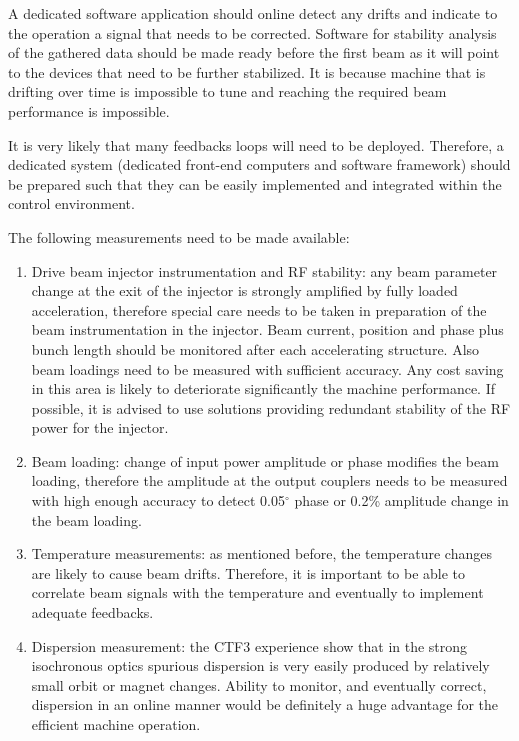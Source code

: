 A dedicated software application should online detect any drifts and 
indicate to the operation a signal that needs to be corrected.
Software for stability analysis of the gathered data should be made ready before the first beam
as it will point to the devices that need to be further stabilized. 
It is because machine that is drifting over time is impossible to tune 
and reaching the required beam performance is impossible.

It is very likely that many feedbacks loops will need to be deployed. 
Therefore, a dedicated system (dedicated front-end computers and software framework) 
should be prepared such that they can be easily implemented
and integrated within the control environment.

The following measurements need to be made available:
\begin{enumerate}

\item Drive beam injector instrumentation and RF stability: any beam parameter change at the exit of the injector
      is strongly amplified by fully loaded acceleration, therefore special care needs to be taken in preparation of
      the beam instrumentation in the injector. Beam current, position and phase plus bunch length should 
      be monitored after each accelerating structure. Also beam loadings need to be measured with sufficient 
      accuracy. Any cost saving in this area is likely to deteriorate significantly the machine performance. 
      If possible, it is advised to use solutions providing redundant stability of the RF power for the injector.

\item Beam loading: change of input power amplitude or phase modifies the beam loading,
      therefore the amplitude at the output couplers needs to be measured with high enough accuracy
      to detect 0.05$^\circ$ phase or 0.2\% amplitude change in the beam loading.

\item Temperature measurements: as mentioned before, the temperature changes are likely to cause beam drifts.
      Therefore, it is important to be able to correlate beam signals with the temperature and eventually
      to implement adequate feedbacks. 

\item Dispersion measurement: the CTF3 experience show that in the strong isochronous optics spurious dispersion
      is very easily produced by relatively small orbit or magnet changes.      
      Ability to monitor, and eventually correct, dispersion in an online manner would be definitely 
      a huge advantage for the efficient machine operation. 


\end{enumerate}
